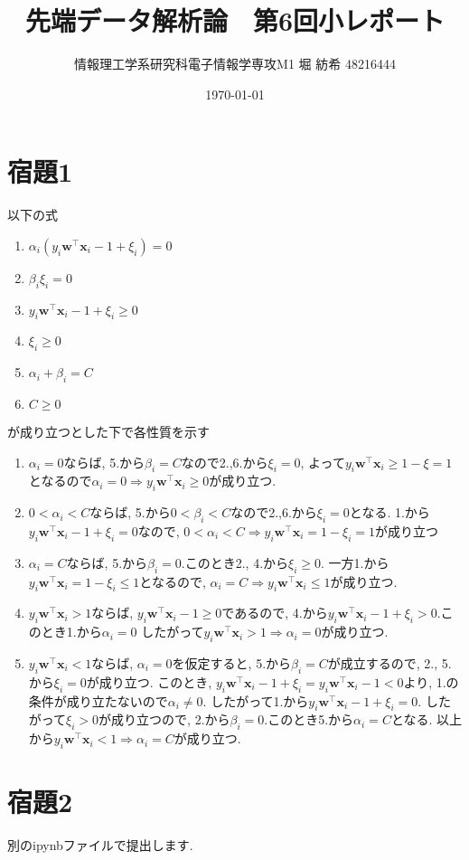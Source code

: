 \documentclass[a4paper,11pt]{jsarticle}
\newcommand{\ywx}{y_i{\bm w}^\top{\bm x}_i}
\begin{document}
  \title{先端データ解析論　第6回小レポート}
  \author{情報理工学系研究科電子情報学専攻M1 堀 紡希 48216444}
  \date{\today}
  \maketitle

  \section*{宿題1}
  以下の式
  \begin{enumerate}
    \item $\alpha_i(\ywx-1+\xi_i)=0$
    \item $\beta_i \xi_i = 0$
    \item $\ywx -1 +\xi_i \geq 0$
    \item $\xi_i \geq 0$
    \item $\alpha _i + \beta _i = C$
    \item $C \geq 0$
  \end{enumerate}
  が成り立つとした下で各性質を示す

  \begin{enumerate}
    \item $\alpha _i = 0$ならば, 5.から$\beta _i = C$なので2.,6.から$\xi_i=0$, 
    よって$\ywx\geq1-\xi=1$となるので$\alpha_i=0\Rightarrow\ywx\geq0$が成り立つ.
    \item $0<\alpha_i<C$ならば, 5.から$0<\beta_i<C$なので2.,6.から$\xi_i=0$となる.
    1.から$\ywx -1+\xi_i=0$なので, $0<\alpha_i<C\Rightarrow\ywx=1-\xi_i=1$が成り立つ
    \item $\alpha_i=C$ならば, 5.から$\beta_i=0$.このとき2., 4.から$\xi_i\geq 0$.
    一方1.から$\ywx=1-\xi_i\leq1$となるので, $\alpha_i=C\Rightarrow \ywx\leq 1$が成り立つ.
    \item $\ywx>1$ならば, $\ywx-1\geq 0$であるので, 4.から$\ywx -1 + \xi_i>0$.このとき1.から$\alpha_i=0$
    したがって$\ywx > 1 \Rightarrow \alpha_i=0$が成り立つ.
    \item $\ywx <1$ならば, $\alpha_i=0$を仮定すると, 5.から$\beta_i=C$が成立するので, 2., 5.から$\xi_i=0$が成り立つ.
    このとき, $\ywx -1+\xi_i = \ywx -1 <0 $より, 1.の条件が成り立たないので$\alpha_i \neq 0$. したがって1.から$\ywx -1+\xi_i=0$.
    したがって$\xi_i>0$が成り立つので, 2.から$\beta_i=0$.このとき5.から$\alpha_i=C$となる.
    以上から$\ywx <1 \Rightarrow \alpha_i=C$が成り立つ.
  \end{enumerate}

  \section*{宿題2}
  別のipynbファイルで提出します.
\end{document}
